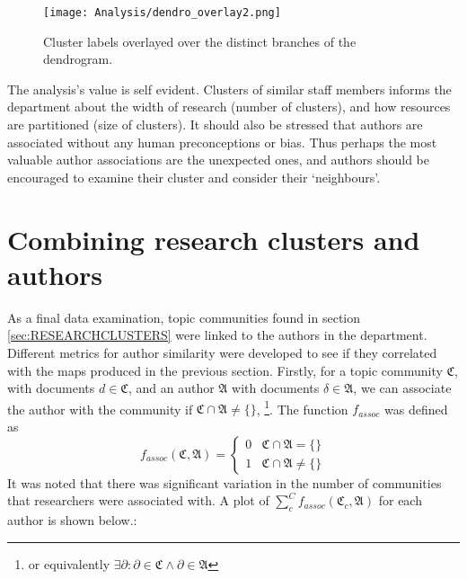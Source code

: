 \begin{center}
\begin{figure}[H]
\label{fig:LABELLEDDENDRO}
  \centering
    \texttt{[image: Analysis/dendro\_overlay2.png]}
    \caption{Cluster labels overlayed over the distinct branches of the dendrogram.}
\end{figure} 
\end{center}
The analysis's value is self evident. Clusters of similar staff members informs the department about the width of research (number of clusters), and how resources are partitioned (size of clusters). It should also be stressed that authors are associated without any human preconceptions or bias. Thus perhaps the most valuable author associations are the unexpected ones, and authors should be encouraged to examine their cluster and consider their `neighbours'.
\section{Combining research clusters and authors}
As a final data examination, topic communities found in section \ref{sec:RESEARCHCLUSTERS} were linked to the authors in the department. Different metrics for author similarity were developed to see if they correlated with the maps produced in the previous section.
Firstly, for a topic community $\mathfrak{C}$, with documents $d \in \mathfrak{C}$, and an author $\mathfrak{A}$ with documents $\delta \in \mathfrak{A}$, we can associate the author with the community if $\mathfrak{C} \cap \mathfrak{A} \neq \{ \}$, \footnote{or equivalently $\exists  \partial : \partial \in \mathfrak{C} \wedge \partial \in \mathfrak{A} $}. The function $f_{assoc}$ was defined as 
\[ 
f_{assoc}\left( \mathfrak{C} , \mathfrak{A} \right) = \begin{cases} 
      0 & \mathfrak{C} \cap \mathfrak{A} = \{ \} \\
      1 & \mathfrak{C} \cap \mathfrak{A} \neq \{ \} 
   \end{cases}
\]
It was noted that there was significant variation in the number of communities that researchers were associated with. A plot of $\sum_c^C f_{assoc} \left( \mathfrak{C}_c , \mathfrak{A} \right)$ for each author is shown below.:
